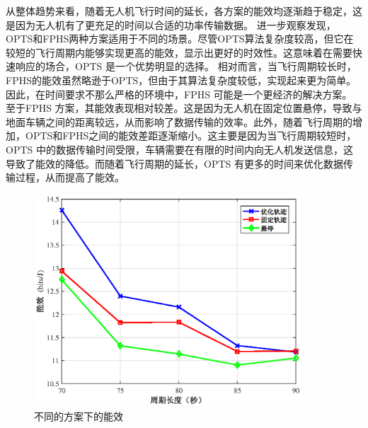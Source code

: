 从整体趋势来看，随着无人机飞行时间的延长，各方案的能效均逐渐趋于稳定，这是因为无人机有了更充足的时间以合适的功率传输数据。
进一步观察发现，OPTS和FPHS两种方案适用于不同的场景。尽管OPTS算法复杂度较高，但它在较短的飞行周期内能够实现更高的能效，显示出更好的时效性。这意味着在需要快速响应的场合，OPTS 是一个优势明显的选择。
相对而言，当飞行周期较长时，FPHS的能效虽然略逊于OPTS，但由于其算法复杂度较低，实现起来更为简单。因此，在时间要求不那么严格的环境中，FPHS 可能是一个更经济的解决方案。
至于FPHS 方案，其能效表现相对较差。这是因为无人机在固定位置悬停，导致与地面车辆之间的距离较远，从而影响了数据传输的效率。此外，随着飞行周期的增加，OPTS和FPHS之间的能效差距逐渐缩小。这主要是因为当飞行周期较短时，OPTS 中的数据传输时间受限，车辆需要在有限的时间内向无人机发送信息，这导致了能效的降低。而随着飞行周期的延长，OPTS 有更多的时间来优化数据传输过程，从而提高了能效。

\begin{figure}[H]
\centering
\includegraphics[width=10cm]{figures//chap4//不同的方案下的能效.eps}
\caption{不同的方案下的能效}
\label{DifferentSchemes}
\end{figure}

